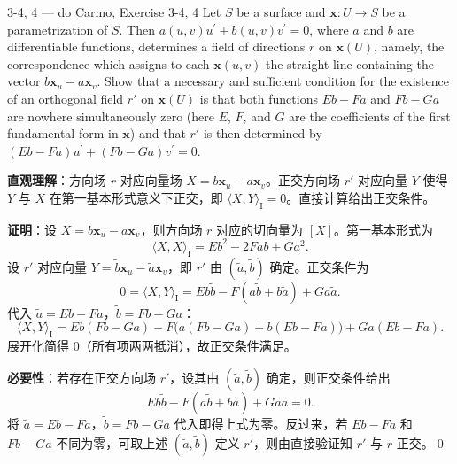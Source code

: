 \begin{exercise}{3-4, 4 — do Carmo, Exercise 3-4, 4}
Let $S$ be a surface and $\mathbf{x}\colon U\to S$ be a parametrization of $S$. Then $a (u, v) u ^ {\prime} + b (u, v) v ^ {\prime} = 0$, where $a$ and $b$ are differentiable functions, determines a field of directions $r$ on $\mathbf{x}(U)$, namely, the correspondence which assigns to each $\mathbf{x}(u,v)$ the straight line containing the vector $b\mathbf{x}_u - a\mathbf{x}_v$. Show that a necessary and sufficient condition for the existence of an orthogonal field $r'$ on $\mathbf{x}(U)$ is that both functions $E b - F a$ and $F b - G a$ are nowhere simultaneously zero (here $E$, $F$, and $G$ are the coefficients of the first fundamental form in $\mathbf{x}$) and that $r'$ is then determined by $(E b - F a) u ^ {\prime} + (F b - G a) v ^ {\prime} = 0$.
\end{exercise}
\begin{solution}
\textbf{直观理解}：方向场 $r$ 对应向量场 $X = b\mathbf{x}_u - a\mathbf{x}_v$。正交方向场 $r'$ 对应向量 $Y$ 使得 $Y$ 与 $X$ 在第一基本形式意义下正交，即 $\langle X,Y\rangle_{\mathrm{I}} = 0$。直接计算给出正交条件。

\textbf{证明}：设 $X = b\mathbf{x}_u - a\mathbf{x}_v$，则方向场 $r$ 对应的切向量为 $[X]$。第一基本形式为
\[
\langle X, X\rangle_{\mathrm{I}} = E b^2 - 2F ab + G a^2.
\]
设 $r'$ 对应向量 $Y = \tilde{b}\mathbf{x}_u - \tilde{a}\mathbf{x}_v$，即 $r'$ 由 $(\tilde{a},\tilde{b})$ 确定。正交条件为
\[
0 = \langle X, Y\rangle_{\mathrm{I}} = E b\tilde{b} - F(a\tilde{b}+b\tilde{a}) + G a\tilde{a}.
\]
代入 $\tilde{a} = E b - F a$，$\tilde{b} = F b - G a$：
\[
\langle X, Y\rangle_{\mathrm{I}} = E b(Fb-Ga) - F\big(a(Fb-Ga)+b(Eb-Fa)\big) + Ga(Eb-Fa).
\]
展开化简得 $0$（所有项两两抵消），故正交条件满足。

\textbf{必要性}：若存在正交方向场 $r'$，设其由 $(\tilde{a},\tilde{b})$ 确定，则正交条件给出
\[
E b\tilde{b} - F(a\tilde{b}+b\tilde{a}) + G a\tilde{a} = 0.
\]
将 $\tilde{a}=Eb-Fa$，$\tilde{b}=Fb-Ga$ 代入即得上式为零。反过来，若 $Eb-Fa$ 和 $Fb-Ga$ 不同为零，可取上述 $(\tilde{a},\tilde{b})$ 定义 $r'$，则由直接验证知 $r'$ 与 $r$ 正交。\qed
\end{solution}

